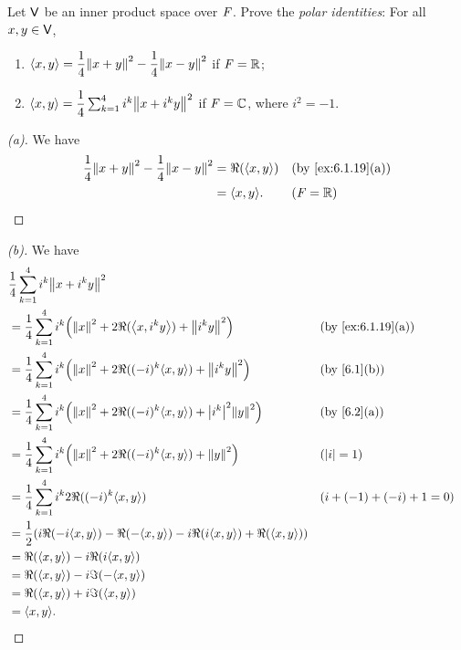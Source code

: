 \begin{ex}\label{ex:6.1.20}
  Let \(\mathsf{V}\) be an inner product space over \(\mathit{F}\).
  Prove the \emph{polar identities}:
  For all \(x, y \in \mathsf{V}\),
  \begin{enumerate}
    \item \(\inn{x, y} = \dfrac{1}{4} \norm{x + y}^2 - \dfrac{1}{4} \norm{x - y}^2\) if \(\mathit{F} = \mathbb{R}\);
    \item \(\inn{x, y} = \dfrac{1}{4} \sum_{k = 1}^4 i^k \norm{x + i^k y}^2\) if \(\mathit{F} = \mathbb{C}\), where \(i^2 = -1\).
  \end{enumerate}
\end{ex}

\begin{proof}[(a)]
  We have
  \begin{align*}
    \dfrac{1}{4} \norm{x + y}^2 - \dfrac{1}{4} \norm{x - y}^2 & = \Re(\inn{x, y}) &  & \by{ex:6.1.19}[a] \\
                                                              & = \inn{x, y}.     &  & (\F = \R)
  \end{align*}
\end{proof}

\begin{proof}[(b)]
  We have
  \begin{align*}
     & \dfrac{1}{4} \sum_{k = 1}^4 i^k \norm{x + i^k y}^2                                                                                   \\
     & = \dfrac{1}{4} \sum_{k = 1}^4 i^k \pa{\norm{x}^2 + 2 \Re(\inn{x, i^k y}) + \norm{i^k y}^2}            &  & \by{ex:6.1.19}[a]         \\
     & = \dfrac{1}{4} \sum_{k = 1}^4 i^k \pa{\norm{x}^2 + 2 \Re((-i)^k \inn{x, y}) + \norm{i^k y}^2}         &  & \by{6.1}[b]               \\
     & = \dfrac{1}{4} \sum_{k = 1}^4 i^k \pa{\norm{x}^2 + 2 \Re((-i)^k \inn{x, y}) + \abs{i^k}^2 \norm{y}^2} &  & \by{6.2}[a]               \\
     & = \dfrac{1}{4} \sum_{k = 1}^4 i^k \pa{\norm{x}^2 + 2 \Re((-i)^k \inn{x, y}) + \norm{y}^2}             &  & (\abs{i} = 1)             \\
     & = \dfrac{1}{4} \sum_{k = 1}^4 i^k 2 \Re((-i)^k \inn{x, y})                                            &  & (i + (-1) + (-i) + 1 = 0) \\
     & = \dfrac{1}{2} \pa{i \Re(-i \inn{x, y}) - \Re(-\inn{x, y}) - i \Re(i \inn{x, y}) + \Re(\inn{x, y})}                                  \\
     & = \Re(\inn{x, y}) - i \Re(i \inn{x, y})                                                                                              \\
     & = \Re(\inn{x, y}) - i \Im(-\inn{x, y})                                                                                               \\
     & = \Re(\inn{x, y}) + i \Im(\inn{x, y})                                                                                                \\
     & = \inn{x, y}.
  \end{align*}
\end{proof}

